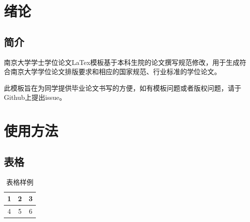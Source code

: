 \documentclass[
    TitleLength = 2,%
]{njuthesis}
\begin{document}
\maketitle
\tableofcontents

\mainmatter

\chapter{绪论}
    \section{简介}
    南京大学学士学位论文LaTex模板\cite{njuthesis}基于本科生院的论文撰写规范修改，用于生成符合南京大学学位论文排版要求和相应的国家规范、行业标准的学位论文。

    此模板旨在为同学提供毕业论文书写的方便，如有模板问题或者版权问题，请于Github上提出issue。
\chapter{使用方法}
    \section{表格}
    \begin{table}[htbp]
        \centering
        \caption{表格样例}
        \begin{tabular}{|c|c|c|}
            \hline
            1 & 2 & 3 \\
            \hline
            4 &  5 & 6 \\
            \hline
        \end{tabular}
    \end{table}
\end{document}

